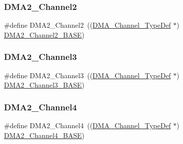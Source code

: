 \mbox{\label{group___peripheral__declaration_ga316024020799373b9d8e35c316c74f24}} 
\subsubsection{\texorpdfstring{DMA2\_Channel2}{DMA2\_Channel2}}
{\footnotesize\ttfamily \#define D\+M\+A2\+\_\+\+Channel2~((\mbox{\hyperlink{struct_d_m_a___channel___type_def}{D\+M\+A\+\_\+\+Channel\+\_\+\+Type\+Def}} $\ast$) \mbox{\hyperlink{group___peripheral__memory__map_ga22f39f23c879c699b88e04a629f69d1c}{D\+M\+A2\+\_\+\+Channel2\+\_\+\+B\+A\+SE}})}

\mbox{\label{group___peripheral__declaration_ga6dca52a79587e0ca9a5d669048b4c7eb}} 
\subsubsection{\texorpdfstring{DMA2\_Channel3}{DMA2\_Channel3}}
{\footnotesize\ttfamily \#define D\+M\+A2\+\_\+\+Channel3~((\mbox{\hyperlink{struct_d_m_a___channel___type_def}{D\+M\+A\+\_\+\+Channel\+\_\+\+Type\+Def}} $\ast$) \mbox{\hyperlink{group___peripheral__memory__map_ga6f2369b8bc155fb55a28891987605c2c}{D\+M\+A2\+\_\+\+Channel3\+\_\+\+B\+A\+SE}})}

\mbox{\label{group___peripheral__declaration_ga612b396657695191ad740b0b59bc9f12}} 
\subsubsection{\texorpdfstring{DMA2\_Channel4}{DMA2\_Channel4}}
{\footnotesize\ttfamily \#define D\+M\+A2\+\_\+\+Channel4~((\mbox{\hyperlink{struct_d_m_a___channel___type_def}{D\+M\+A\+\_\+\+Channel\+\_\+\+Type\+Def}} $\ast$) \mbox{\hyperlink{group___peripheral__memory__map_ga01b063266473f290a55047654fbbfbee}{D\+M\+A2\+\_\+\+Channel4\+\_\+\+B\+A\+SE}})}

